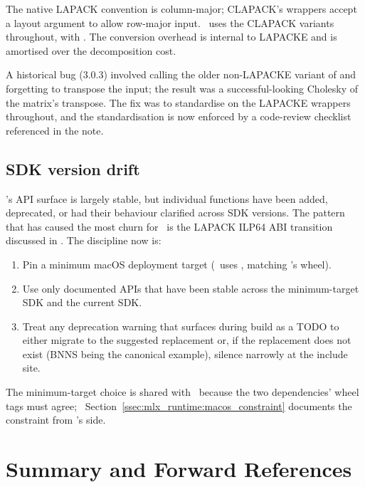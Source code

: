 The native LAPACK convention is column-major; CLAPACK's
 wrappers accept a layout argument to allow
row-major input. \Lucid\ uses the CLAPACK  variants
throughout, with . The conversion overhead
is internal to LAPACKE and is amortised over the decomposition cost.

A historical bug (3.0.3) involved calling the older non-LAPACKE
variant of  and forgetting to transpose the input; the
result was a successful-looking Cholesky of the matrix's transpose.
The fix was to standardise on the LAPACKE wrappers throughout, and
the standardisation is now enforced by a code-review checklist
referenced in the  note.

\subsection{SDK version drift}
\label{ssec:accelerate:sdk_drift}

\Accelerate's API surface is largely stable, but individual
functions have been added, deprecated, or had their behaviour
clarified across SDK versions. The pattern that has caused the
most churn for \Lucid\ is the LAPACK ILP64 ABI transition discussed
in . The discipline now is:

\begin{enumerate}
  \item Pin a minimum macOS deployment target (\Lucid\ uses
    , matching \MLX's wheel).
  \item Use only documented APIs that have been stable across the
    minimum-target SDK and the current SDK.
  \item Treat any deprecation warning that surfaces during build as
    a TODO to either migrate to the suggested replacement or, if
    the replacement does not exist (BNNS being the canonical
    example), silence narrowly at the include site.
\end{enumerate}

The minimum-target choice is shared with \MLX\ because the two
dependencies' wheel tags must agree; 
~Section~\ref{ssec:mlx_runtime:macos_constraint} documents the
constraint from \MLX's side.

\section{Summary and Forward References}
\label{sec:accelerate:summary}

